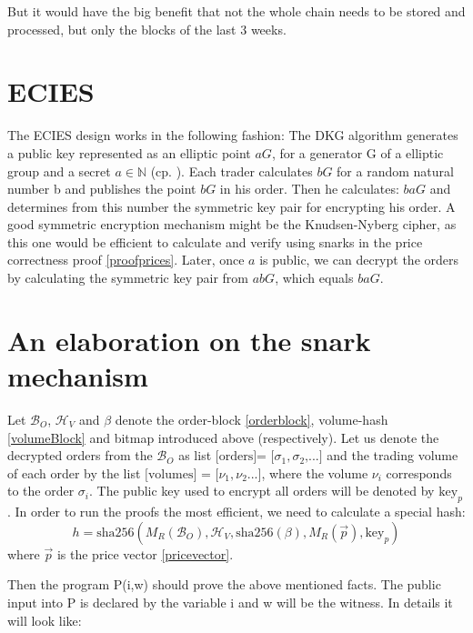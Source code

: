 \documentclass[11pt,parskip=full]{scrartcl}%
\begin{document}
But it would have the big benefit that not the whole chain needs to be stored and processed, but only the blocks of the last 3 weeks. 
\begin{appendices}
\section{ECIES}
\label{ECIES}
The ECIES design works in the following fashion:
The DKG algorithm generates a public key represented as an elliptic point $aG\label{public key}$, for a generator G of a elliptic group and a secret $a\in \mathbb{N}$ (cp. \cite{DKG}).  Each trader calculates $bG \label{salt}$ for a random natural number b and publishes the point $bG$  in his order. 
Then he calculates: $baG$ and determines from this number the symmetric key pair for encrypting his order. 
A good symmetric encryption mechanism might be the Knudsen-Nyberg cipher\cite{cipher}, as this one would be efficient to calculate and verify using snarks in the price correctness proof \ref{proofprices}.
Later, once $a$ is public, we can decrypt the orders by calculating the symmetric key pair from $abG$, which equals $baG$.

\section{An elaboration on the snark mechanism}
\label{snarkElaboration}
Let $\mathcal{B}_O$, $\mathcal{H}_V$ and $\beta$ denote the order-block \ref{orderblock}, volume-hash \ref{volumeBlock} and bitmap introduced above (respectively). 
Let us denote the decrypted orders from the $\mathcal{B}_O$ as list $\text{[orders]= [}\sigma_1, \sigma_2\text{,...]}$ and the trading volume of each order by the list $\text{[volumes] = [}\nu_1, \nu_2\text{...]}$, where the volume $\nu_i$ corresponds to the order $\sigma_i$. 
The public key used to encrypt all orders will be denoted by $\text{key}_p$.
In order to run the proofs the most efficient, we need to calculate a special hash:
\begin{equation}
h = \text{sha256}(M_R(\mathcal{B}_O),\mathcal{H}_V, \text{sha256}(\beta), M_R(\vec{p}), \text{key}_p) 
\end{equation}
where $\vec{p}$ is the price vector \ref{pricevector}.

Then the program P(i,w) should prove the above mentioned facts. 
The public input into P is declared by the variable i and w will be the witness. 
In details it will look like:


\end{appendices}
\end{document}
